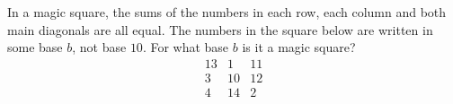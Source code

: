 In a magic square, the sums of the numbers in each row, each column and both main diagonals are all equal. The numbers in the square below are written in some base $b$, not base $10$. For what base $b$ is it a magic square?
\[
\begin{array}{ccc}
13&1&11\\
3&10&12\\
4&14&2
\end{array}
\]
